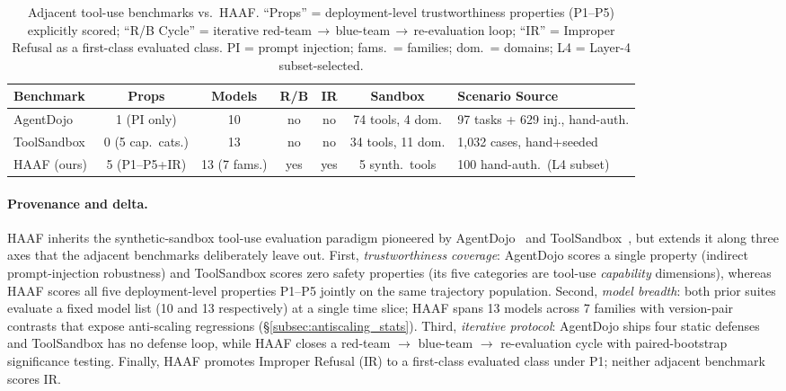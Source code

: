 \begin{table}[!htbp]
\centering
\caption{Adjacent tool-use benchmarks vs.\ HAAF. ``Props'' = deployment-level trustworthiness properties (P1--P5) explicitly scored; ``R/B Cycle'' = iterative red-team$\,\to\,$blue-team$\,\to\,$re-evaluation loop; ``IR'' = Improper Refusal as a first-class evaluated class. PI = prompt injection; fams.\ = families; dom.\ = domains; L4 = Layer-4 subset-selected.}
\label{tab:related_delta}
\small
\setlength{\tabcolsep}{3pt}
\begin{tabular*}{\linewidth}{@{\extracolsep{\fill}}lcccccl@{}}
\toprule
\textbf{Benchmark} & \textbf{Props} & \textbf{Models} & \textbf{R/B} & \textbf{IR} & \textbf{Sandbox} & \textbf{Scenario Source} \\
\midrule
AgentDojo~\cite{debenedetti2024agentdojo}     & 1 (PI only)        & 10              & no  & no  & 74 tools, 4 dom.   & 97 tasks + 629 inj., hand-auth.\\
ToolSandbox~\cite{lu2024toolsandbox}          & 0 (5 cap.\ cats.)  & 13              & no  & no  & 34 tools, 11 dom.  & 1{,}032 cases, hand+seeded \\
HAAF (ours)                                   & 5 (P1--P5+IR)      & 13 (7 fams.)    & yes & yes & 5 synth.\ tools    & 100 hand-auth.\ (L4 subset)\\
\bottomrule
\end{tabular*}
\end{table}

\paragraph{Provenance and delta.}
HAAF inherits the synthetic-sandbox tool-use evaluation paradigm pioneered by AgentDojo~\cite{debenedetti2024agentdojo} and ToolSandbox~\cite{lu2024toolsandbox}, but extends it along three axes that the adjacent benchmarks deliberately leave out. First, \emph{trustworthiness coverage}: AgentDojo scores a single property (indirect prompt-injection robustness) and ToolSandbox scores zero safety properties (its five categories are tool-use \emph{capability} dimensions), whereas HAAF scores all five deployment-level properties P1--P5 jointly on the same trajectory population. Second, \emph{model breadth}: both prior suites evaluate a fixed model list (10 and 13 respectively) at a single time slice; HAAF spans 13 models across 7 families with version-pair contrasts that expose anti-scaling regressions (\S\ref{subsec:antiscaling_stats}). Third, \emph{iterative protocol}: AgentDojo ships four static defenses and ToolSandbox has no defense loop, while HAAF closes a red-team $\to$ blue-team $\to$ re-evaluation cycle with paired-bootstrap significance testing. Finally, HAAF promotes Improper Refusal (IR) to a first-class evaluated class under P1; neither adjacent benchmark scores IR.
